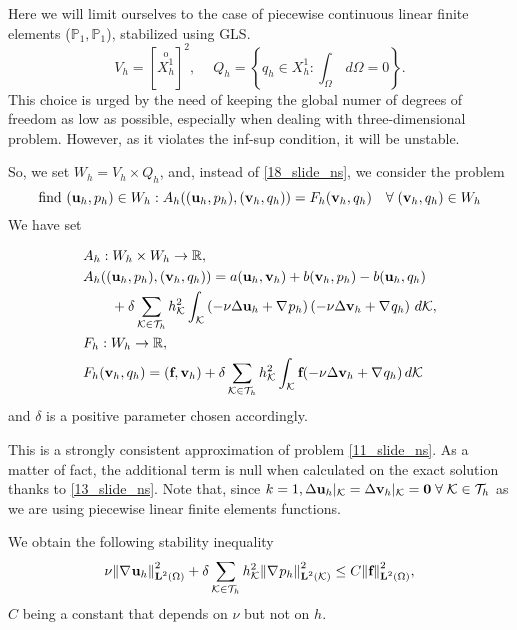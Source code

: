 Here we will limit ourselves to the case of piecewise continuous linear finite elements (\(\mathbb{P}_1, \mathbb{P}_1\)), stabilized using GLS.
\[
    V_h = [\overset{\mathrm{o}}{X^1_h}]^2, \ \quad Q_h = \left\{ q_h \in X_h^1 : \int_\Omega \, d\Omega = 0 \right\}.
\]
This choice is urged by the need of keeping the global numer of degrees of freedom as low as possible, especially when dealing with three-dimensional problem. However, as it violates the inf-sup condition, it will be unstable.

So, we set \(W_h = V_h \times Q_h\), and, instead of \eqref{18_slide_ns}, we consider the problem 
\begin{equation}
    \text{find } (\textbf{u}_h, p_h) \in W_h : A_h ((\textbf{u}_h, p_h), (\textbf{v}_h, q_h)) = F_h (\textbf{v}_h, q_h) \quad \forall \; (\textbf{v}_h, q_h) \in W_h 
    \label{53_slide_ns}
\end{equation}
We have set 

\begin{align*}
    &A_h : W_h \times W_h \to \mathbb{R}, \\
    &A_h((\textbf{u}_h, p_h), (\textbf{v}_h, q_h)) = a(\textbf{u}_h, \textbf{v}_h) + b(\textbf{v}_h, p_h) - b(\textbf{u}_h, q_h) \\
    &\qquad + \delta \sum_{{\mathcal{K}\in\mathcal{T}_h}} h_{\mathcal{K}}^2 \int_{\mathcal{K}} \left( -\nu\Delta \textbf{u}_h + \nabla\mspace{1mu} p_h \right)\left( -\nu \Delta \textbf{v}_h + \nabla\mspace{1mu} q_h \right) \, d\mathcal{K}, \\
    &F_h : W_h \to \mathbb{R}, \\
    &F_h(\textbf{v}_h, q_h) = (\textbf{f},\textbf{v}_h) + \delta \sum_{\mathcal{K}\in\mathcal{T}_h} h^2_{\mathcal{K}} \int_{\mathcal{K}} \textbf{f}(-\nu\Delta \textbf{v}_h + \nabla\mspace{1mu} q_h) \, d\mathcal{K}
\end{align*}
and \(\delta\) is a positive parameter chosen accordingly.

This is a strongly consistent approximation of problem \eqref{11_slide_ns}. As a matter of fact, the additional term is null when calculated on the exact solution thanks to \eqref{13_slide_ns}. Note that, since \(k=1, \Delta {\textbf{u}_h}\vert_{\mathcal{K}} = \Delta {\textbf{v}_h}\vert_{\mathcal{K}} = \textbf{0} \; \forall \; {\mathcal{K}\in\mathcal{T}_h}\) as we are using piecewise linear finite elements functions.

We obtain the following stability inequality 
\begin{equation}
    \nu \norm{\nabla\mspace{1mu}\textbf{u}_h}_{\textbf{L}^2(\Omega)}^2 + \delta \sum_{\mathcal{K}\in\mathcal{T}_h} h^2_{\mathcal{K}} \norm{\nabla\mspace{1mu} p_h}^2_{\textbf{L}^2 (\mathcal{K})} \leq C \norm{\textbf{f}}^2_{\textbf{L}^2(\Omega)},
    \label{55_slide_ns}
\end{equation}
\(C\) being a constant that depends on \(\nu\) but not on \(h\). 

